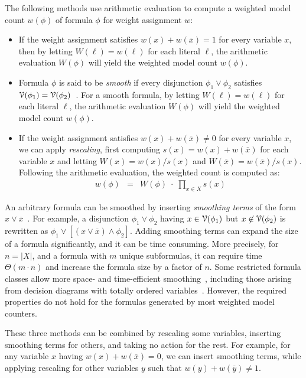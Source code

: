 \documentclass[letterpaper,USenglish,cleveref, autoref, thm-restate]{lipics-v2021}
\newcommand{\obar}[1]{\overline{#1}}
\newcommand{\lit}{\ell}
\newcommand{\varset}{X}
\newcommand{\dependencyset}{{\cal V}}
\begin{document}
The following methods use arithmetic evaluation to compute a weighted model count $w(\phi)$ of formula $\phi$ for weight assignment $w$:
\begin{itemize}
\item If the weight assignment satisfies $w(x) + w(\obar{x}) = 1$  for every variable $x$,
  then by letting $W(\lit) = w(\lit)$ for each literal $\lit$, the arithmetic evaluation $W(\phi)$ will yield the weighted model count $w(\phi)$.
\item Formula $\phi$ is said to be \emph{smooth} if every disjunction $\phi_1 \lor \phi_2$ satisfies
  $\dependencyset(\phi_1) = \dependencyset(\phi_2)$~\cite{darwiche:jancl:2001,darwiche:jair:2002}.  For a smooth formula, 
by letting $W(\lit) = w(\lit)$ for each literal $\lit$, the arithmetic evaluation $W(\phi)$ will yield the weighted model count $w(\phi)$.
\item If the weight assignment satisfies $w(x) + w(\obar{x}) \not = 0$ for every variable $x$,
  we can apply \emph{rescaling}, first computing $s(x) = w(x) + w(\obar{x})$ for each variable $x$
  and letting $W(x) = w(x)/s(x)$ and $W(\obar{x}) = w(\obar{x})/s(x)$.  
  Following the arithmetic evaluation, the weighted count is computed as:
  \begin{eqnarray}
w(\phi) &=& W(\phi)\; \cdot \;  \prod_{x\in\varset} s(x)  \label{eqn:rescale}
  \end{eqnarray}
\end{itemize}

An arbitrary formula can be smoothed by inserting \emph{smoothing terms} of the form $x \lor \obar{x}$~\cite{darwiche:jancl:2001}.
For example,
  a disjunction $\phi_1 \lor \phi_2$ having $x \in \dependencyset(\phi_1)$ but
  $x \not\in \dependencyset(\phi_2)$ is rewritten as $\phi_1 \lor [(x \lor \obar{x}) \land \phi_2]$.
  Adding smoothing terms can expand the size of a formula significantly, and it can be time consuming.
  More precisely, for $n = |X|$, and a formula with $m$ unique subformulas, it can require time $\Theta(m\cdot n)$ and increase the formula size by a factor of $n$.
  Some restricted formula classes allow more space- and time-efficient smoothing~\cite{shih:neurips:2019}, including those arising from decision
  diagrams with totally ordered variables~\cite{bryant:ieeetc:1986,minato:sttt:2001}.
  However, the required properties do not hold for the formulas generated by most weighted model counters.
  
  These three methods can be combined by rescaling some variables,
  inserting smoothing terms for others, and taking no action for the rest.
  For example,
  for any variable $x$ having $w(x) + w(\obar{x}) = 0$, we can insert
  smoothing terms, while applying rescaling for other variables $y$ such that $w(y) + w(\obar{y}) \not= 1$.
\end{document}
